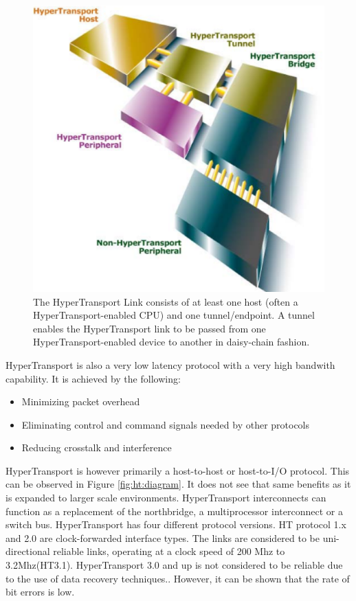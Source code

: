 \documentclass[conference]{IEEEtran}
\begin{document}
\begin{figure}[!t]
	\begin{center}
		\includegraphics[scale=.35]{htLinks}
	\end{center}
	\caption{
	 The HyperTransport Link consists of at least one host (often a
	 HyperTransport-enabled CPU) and one tunnel/endpoint. A tunnel enables the
	 HyperTransport link to be passed from one HyperTransport-enabled device to
	 another in daisy-chain fashion.
	\cite{htWhitePaper}\label{fig:htLinks}}
	\label{fig:ht:packet}
\end{figure}

HyperTransport is also a very low latency protocol with a very high bandwith
capability. It is achieved by the following:\cite{duato2009extending}

\begin{itemize}
  \item Minimizing packet overhead
  \item Eliminating control and command signals needed by other protocols
  \item Reducing crosstalk and interference
\end{itemize}

HyperTransport is however primarily a host-to-host or host-to-I/O protocol.
This can be observed in Figure \ref{fig:ht:diagram}. It does not see that same
benefits as it is expanded to larger scale environments. HyperTransport interconnects can function as a replacement of the
northbridge,  a multiprocessor interconnect or a switch bus. 
HyperTransport has four different protocol versions. HT protocol 1.x and 2.0
are clock-forwarded interface types. The links are considered to be
uni-directional reliable links, operating at a clock speed of 200 Mhz to 3.2Mhz(HT3.1).
HyperTransport 3.0 and up is not considered to be reliable due to the use of
data recovery techniques.\cite{holden2006latency}. However, it can be shown that
the rate of bit errors is low. 
\end{document}
